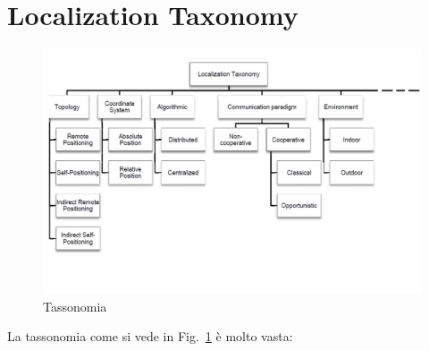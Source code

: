         \section{Localization Taxonomy}\label{subsec3.3}
        \begin{figure}
                \centering
                \includegraphics[scale=0.5]{fig1-lec3pt1.png}
                \caption{Tassonomia}
                \label{fig:fig1-lec3pt1}
        \end{figure}
        La tassonomia come si vede in Fig.~\ref{fig:fig1-lec3pt1} è molto vasta:
